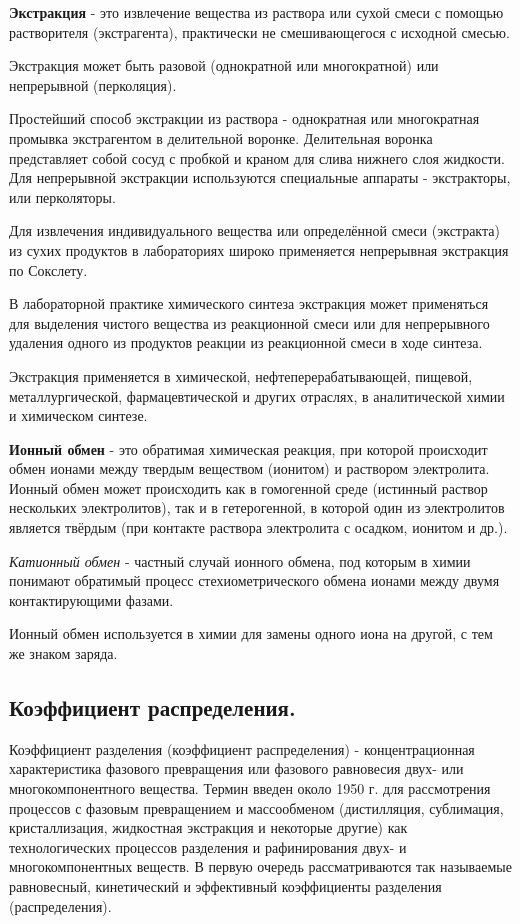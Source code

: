 \documentclass[14pt,a4paper]{scrartcl}
\begin{document}
\textbf{Экстракция} - это извлечение вещества из раствора или сухой смеси с помощью растворителя (экстрагента), практически не смешивающегося с исходной смесью.

Экстракция может быть разовой (однократной или многократной) или непрерывной (перколяция).

Простейший способ экстракции из раствора - однократная или многократная промывка экстрагентом в делительной воронке. Делительная воронка представляет собой сосуд с пробкой и краном для слива нижнего слоя жидкости. Для непрерывной экстракции используются специальные аппараты - экстракторы, или перколяторы.

Для извлечения индивидуального вещества или определённой смеси (экстракта) из сухих продуктов в лабораториях широко применяется непрерывная экстракция по Сокслету.

В лабораторной практике химического синтеза экстракция может применяться для выделения чистого вещества из реакционной смеси или для непрерывного удаления одного из продуктов реакции из реакционной смеси в ходе синтеза.

Экстракция применяется в химической, нефтеперерабатывающей, пищевой, металлургической, фармацевтической и других отраслях, в аналитической химии и химическом синтезе.

\textbf{Ионный обмен} - это обратимая химическая реакция, при которой происходит обмен ионами между твердым веществом (ионитом) и раствором электролита. Ионный обмен может происходить как в гомогенной среде (истинный раствор нескольких электролитов), так и в гетерогенной, в которой один из электролитов является твёрдым (при контакте раствора электролита с осадком, ионитом и др.).

\emph{Катионный обмен} - частный случай ионного обмена, под которым в химии понимают обратимый процесс стехиометрического обмена ионами между двумя контактирующими фазами.

Ионный обмен используется в химии для замены одного иона на другой, с тем же знаком заряда.
\subsection*{Коэффициент распределения.}

Коэффициент разделения (коэффициент распределения) - концентрационная характеристика фазового превращения или фазового равновесия двух- или многокомпонентного вещества. Термин введен около 1950 г. для рассмотрения процессов с фазовым превращением и массообменом (дистилляция, сублимация, кристаллизация, жидкостная экстракция и некоторые другие) как технологических процессов разделения и рафинирования двух- и многокомпонентных веществ. В первую очередь рассматриваются так называемые равновесный, кинетический и эффективный коэффициенты разделения (распределения).
\end{document}
